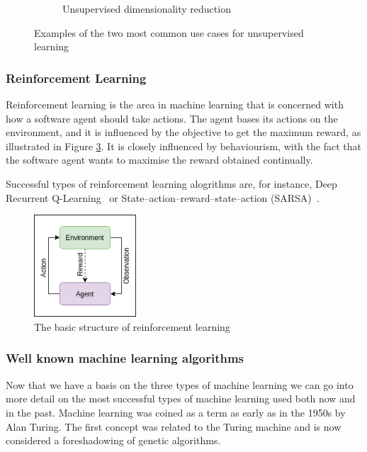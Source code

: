 \begin{figure}[h]
\begin{subfigure}[t]{0.34\textwidth}
         \caption{Unsupervised dimensionality reduction}
         \label{fig:unsupervised_PCA}
     \end{subfigure}
        \caption{Examples of the two most common use cases for unsupervised learning}
        \label{fig:unsupervised_learning}
\end{figure}
      

\FloatBarrier
\subsubsection{Reinforcement Learning}
Reinforcement learning is the area in machine learning that is concerned with how a software agent should take actions.
The agent bases its actions on the environment, and it is influenced by the objective to get the maximum reward, as illustrated in Figure \ref{fig:reinforcement_learning}.
It is closely influenced by behaviourism, with the fact that the software agent wants to maximise the reward obtained continually. 

Successful types of reinforcement learning alogrithms are, for instance, Deep Recurrent Q-Learning~\cite{DBLP:journals/corr/HausknechtS15} or State–action–reward–state–action (SARSA)~\cite{Rummery94on-lineq-learning}.
\FloatBarrier

\begin{figure}[h]
        \centering
        \includegraphics[width=0.34\textwidth]{background/figures/reinforcement.png}
        \caption{The basic structure of reinforcement learning}
        \label{fig:reinforcement_learning}
\end{figure}


\FloatBarrier
\subsubsection{Well known machine learning algorithms}
Now that we have a basis on the three types of machine learning we can go into more detail on the most successful types of machine learning used both now and in the past. 
Machine learning was coined as a term as early as in the 1950s by Alan Turing. The first concept was related to the Turing machine and is now considered a foreshadowing of genetic algorithms.~\cite{10.1093/mind/LIX.236.433}

